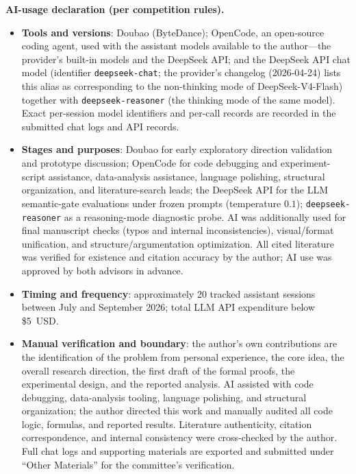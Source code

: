 \documentclass{article}
\theoremstyle{definition}
\begin{document}
\noindent\textbf{AI-usage declaration (per competition rules).}
\begin{itemize}
  \item \textbf{Tools and versions}: Doubao (ByteDance); OpenCode, an
    open-source coding agent, used with the assistant models available to
    the author---the provider's built-in models and the DeepSeek API; and
    the DeepSeek API chat model (identifier \texttt{deepseek-chat}; the
    provider's changelog (2026-04-24) lists this alias as corresponding
    to the non-thinking mode of DeepSeek-V4-Flash) together with
    \texttt{deepseek-reasoner} (the thinking mode of the same model).
    Exact per-session model identifiers and per-call records are recorded
    in the submitted chat logs and API records.
  \item \textbf{Stages and purposes}: Doubao for early exploratory direction
    validation and prototype discussion; OpenCode for code debugging and
    experiment-script assistance, data-analysis assistance, language
    polishing, structural organization, and literature-search leads; the
    DeepSeek API for the
    LLM semantic-gate evaluations under frozen prompts
    (temperature $0.1$); \texttt{deepseek-reasoner} as a reasoning-mode
    diagnostic probe. AI was additionally used for final manuscript
    checks (typos and internal inconsistencies), visual/format
    unification, and structure/argumentation optimization. All cited
    literature was verified for existence and citation accuracy by the
    author; AI use was approved by both advisors in advance.
  \item \textbf{Timing and frequency}: approximately 20 tracked assistant
    sessions between July and September 2026; total LLM API expenditure
    below \$5~USD.
  \item \textbf{Manual verification and boundary}: the author's own
    contributions are the identification of the problem from personal
    experience, the core idea, the overall research direction, the first
    draft of the formal proofs, the experimental design, and the reported
    analysis. AI assisted with code debugging, data-analysis
    tooling, language polishing, and structural organization; the author
    directed this work and manually audited all code logic,
    formulas, and reported results. Literature authenticity, citation
    correspondence, and internal consistency were cross-checked by the
    author. Full chat logs and supporting materials are exported and
    submitted under ``Other Materials'' for the committee's verification.
\end{itemize}
\end{document}
